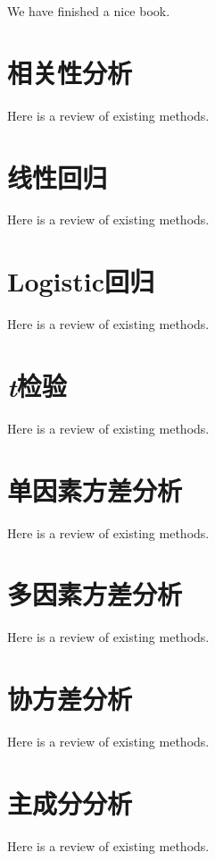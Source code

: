 \documentclass[
]{book}
\begin{document}
We have finished a nice book.

\hypertarget{ux76f8ux5173ux6027ux5206ux6790}{%
\chapter{相关性分析}\label{ux76f8ux5173ux6027ux5206ux6790}}

Here is a review of existing methods.

\hypertarget{ux7ebfux6027ux56deux5f52}{%
\chapter{线性回归}\label{ux7ebfux6027ux56deux5f52}}

Here is a review of existing methods.

\hypertarget{logisticux56deux5f52}{%
\chapter{Logistic回归}\label{logisticux56deux5f52}}

Here is a review of existing methods.

\hypertarget{tux68c0ux9a8c}{%
\chapter{\texorpdfstring{\emph{t}检验}{t检验}}\label{tux68c0ux9a8c}}

Here is a review of existing methods.

\hypertarget{ux5355ux56e0ux7d20ux65b9ux5deeux5206ux6790}{%
\chapter{单因素方差分析}\label{ux5355ux56e0ux7d20ux65b9ux5deeux5206ux6790}}

Here is a review of existing methods.

\hypertarget{ux591aux56e0ux7d20ux65b9ux5deeux5206ux6790}{%
\chapter{多因素方差分析}\label{ux591aux56e0ux7d20ux65b9ux5deeux5206ux6790}}

Here is a review of existing methods.

\hypertarget{ux534fux65b9ux5deeux5206ux6790}{%
\chapter{协方差分析}\label{ux534fux65b9ux5deeux5206ux6790}}

Here is a review of existing methods.

\hypertarget{ux4e3bux6210ux5206ux5206ux6790}{%
\chapter{主成分分析}\label{ux4e3bux6210ux5206ux5206ux6790}}

Here is a review of existing methods.

  
\end{document}
